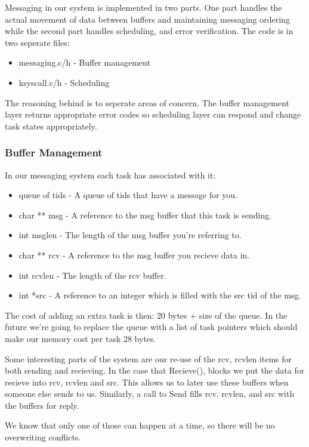 \documentclass{article}
\begin{document}
Messaging in our system is implemented in two parts. One part handles the actual movement of data between buffers and maintaining messaging ordering while the second part handles scheduling, and error verification. The code is in two seperate files:
\begin{itemize}
    \item messaging.{c/h} - Buffer management
    \item ksyscall.{c/h} - Scheduling
\end{itemize}
The reasoning behind is to seperate areas of concern. The buffer management layer returns appropriate error codes so scheduling layer can respond and change task states appropriately.

\subsubsection{Buffer Management}

In our messaging system each task has associated with it:
\begin{itemize}
    \item queue of tids - A queue of tids that have a message for you.
    \item char ** msg - A reference to the msg buffer that this task is sending.
    \item int msglen - The length of the msg buffer you're referring to.
    \item char ** rcv - A reference to the msg buffer you recieve data in.
    \item int rcvlen - The length of the rcv buffer.
    \item int *src - A reference to an integer which is filled with the src tid of the msg.
\end{itemize}

The cost of adding an extra task is then: 20 bytes + size of the queue. In the future we're going to replace the queue with a list of task pointers which should make our memory cost per task 28 bytes.

Some interesting parts of the system are our re-use of the rcv, rcvlen items for both sending and recieving. In the case that Recieve(), blocks we put the data for recieve into rcv, rcvlen and src. This allows us to later use these buffers when someone else sends to us. Similarly, a call to Send fills rcv, rcvlen, and src with the buffers for reply.

We know that only one of those can happen at a time, so there will be no overwriting conflicts.
\end{document}
